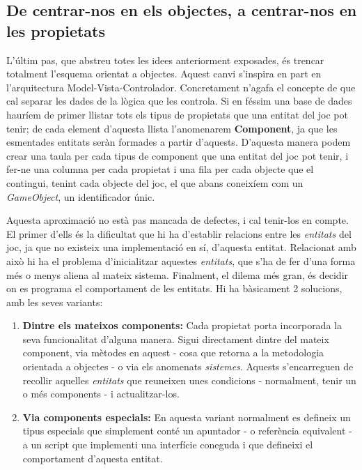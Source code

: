 \subsection{De centrar-nos en els objectes, a centrar-nos en les propietats}

L'últim pas, que abstreu totes les idees anteriorment exposades, és trencar totalment l'esquema orientat a objectes. Aquest canvi s'inspira en part en l'arquitectura Model-Vista-Controlador. Concretament n'agafa el concepte de que cal separar les dades de la lògica que les controla. Si en féssim una base de dades hauríem de primer llistar tots els tipus de propietats que una entitat del joc pot tenir; de cada element d'aquesta llista l'anomenarem {\bf Component}, ja que les esmentades entitats seràn formades a partir d'aquests. D'aquesta manera podem crear una taula per cada tipus de component que una entitat del joc pot tenir, i fer-ne una columna per cada propietat i una fila per cada objecte que el contingui, tenint cada objecte del joc, el que abans coneixíem com un {\em GameObject}, un identificador únic.

Aquesta aproximació no està pas mancada de defectes, i cal tenir-los en compte. El primer d'ells és la dificultat que hi ha d'establir relacions entre les {\em entitats} del joc, ja que no existeix una implementació en sí, d'aquesta entitat. Relacionat amb això hi ha el problema d'inicialitzar aquestes {\em entitats}, que s'ha de fer d'una forma més o menys aliena al mateix sistema. Finalment, el dilema més gran, és decidir on es programa el comportament de les entitats. Hi ha bàsicament 2 solucions, amb les seves variants:

\begin{enumerate}
  \item {\bf Dintre els mateixos components:} Cada propietat porta incorporada la seva funcionalitat d'alguna manera. Sigui directament dintre del mateix component, via mètodes en aquest - cosa que retorna a la metodologia orientada a objectes - o via els anomenats {\em sistemes}. Aquests s'encarreguen de recollir aquelles {\em entitats} que reuneixen unes condicions - normalment, tenir un o més components - i actualitzar-los.
    
  \item {\bf Via components especials:} En aquesta variant normalment es defineix un tipus especials que simplement conté un apuntador - o referència equivalent - a un script que implementi una interfície coneguda i que defineixi el comportament d'aquesta entitat.
    
\end{enumerate}

